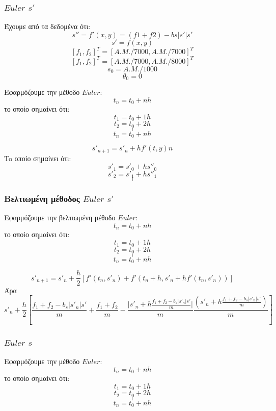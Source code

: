 \documentclass[a4paper]{article}
\begin{document}
        
        \subsubsection*{$Euler$ $s'$}
        Έχουμε από τα δεδομένα ότι:
        \begin{equation}
            s''=f'(x,y)=(f1+f2)-bs|s'|s'
        \end{equation}
        \begin{equation}
            s'=f(x,y)
        \end{equation}
        \[{[f_1,f_2]}^T={[A.M./7000, A.M./7000]}^T\]
        \[{[f_1,f_2]}^T={[A.M./7000, A.M./8000]}^T\]
        \[s_0=A.M./1000\]
        \[\theta_0=0\]

        Εφαρμόζουμε την μέθοδο $Euler$:
        \[t_n=t_0+nh\]
        το οποίο σημαίνει ότι:
        \[t_1=t_0+1h\]
        \[t_2=t_0+2h\]
        \[.\]
        \[.\]
        \[.\]
        \[t_n=t_0+nh\]

        \hrulefill{}

        \[s'_{n+1}=s'_n+hf'(t,y)n\]
        To οποίο σημαίνει ότι:
        \[s'_1=s'_0+hs''_0\]
        \[s'_2=s'_1+hs''_1\]
        \[.\]
        \[.\]
        \[.\]
        
        \subsubsection*{Bελτιωμένη μέθοδος $Euler$ $s'$}
        Εφαρμόζουμε την βελτιωμένη μέθοδο $Euler$:
        \[t_n=t_0+nh\]
        το οποίο σημαίνει ότι:
        \[t_1=t_0+1h\]
        \[t_2=t_0+2h\]
        \[.\]
        \[.\]
        \[.\]
        \[t_n=t_0+nh\]

        \hrulefill{}
        \[s'_{n+1}=s'_n+\frac{h}{2}{[f'(t_n, s'_n)+f'(t_n+h, s'_n+hf'(t_n,s'_n))]}\]
        Άρα
        \[s'_n+\frac{h}{2}{[\frac{f_1+f_2-b_s\rvert s'_n \lvert s'}{m}+\frac{f_1+f_2}{m}-\frac{\lvert s'_n+h\frac{f_1+f_2-b_s\rvert s'_n \lvert s'}{m}\rvert}{m}\frac{(s'_n+h\frac{f_1+f_2-b_s\rvert s'_n \lvert s'}{m})}{m}]}\]
        
        \subsubsection*{$Euler$ $s$}
        Εφαρμόζουμε την μέθοδο $Euler$:
        \[t_n=t_0+nh\]
        το οποίο σημαίνει ότι:
        \[t_1=t_0+1h\]
        \[t_2=t_0+2h\]
        \[.\]
        \[.\]
        \[.\]
        \[t_n=t_0+nh\]

        \hrulefill{}
\end{document}
